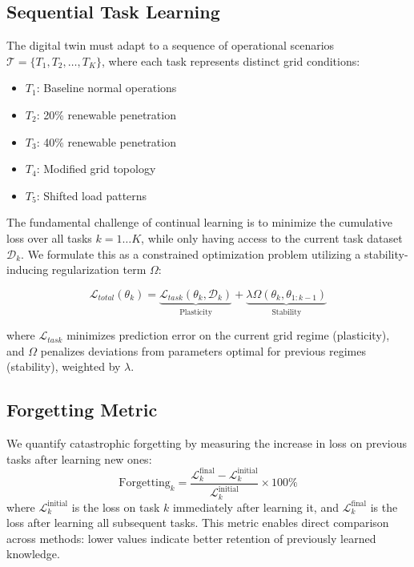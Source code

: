 \documentclass[journal,12pt,onecolumn]{IEEEtran}
\begin{document}
\subsection{Sequential Task Learning}

The digital twin must adapt to a sequence of operational scenarios $\mathcal{T} = \{T_1, T_2, \ldots, T_K\}$, where each task represents distinct grid conditions:
\begin{itemize}
    \item $T_1$: Baseline normal operations
    \item $T_2$: 20\% renewable penetration
    \item $T_3$: 40\% renewable penetration
    \item $T_4$: Modified grid topology
    \item $T_5$: Shifted load patterns
\end{itemize}

The fundamental challenge of continual learning is to minimize the cumulative loss over all tasks $k=1 \dots K$, while only having access to the current task dataset $\mathcal{D}_k$. We formulate this as a constrained optimization problem utilizing a stability-inducing regularization term $\Omega$:

\begin{equation}
\mathcal{L}_{total}(\theta_k) = \underbrace{\mathcal{L}_{task}(\theta_k, \mathcal{D}_k)}_{\text{Plasticity}} + \underbrace{\lambda \Omega(\theta_k, \theta_{1:k-1})}_{\text{Stability}}
\label{eq:cl_objective}
\end{equation}

where $\mathcal{L}_{task}$ minimizes prediction error on the current grid regime (plasticity), and $\Omega$ penalizes deviations from parameters optimal for previous regimes (stability), weighted by $\lambda$.

\subsection{Forgetting Metric}

We quantify catastrophic forgetting by measuring the increase in loss on previous tasks after learning new ones:
\begin{equation}
\text{Forgetting}_k = \frac{\mathcal{L}_k^{\text{final}} - \mathcal{L}_k^{\text{initial}}}{\mathcal{L}_k^{\text{initial}}} \times 100\%
\label{eq:forgetting}
\end{equation}
where $\mathcal{L}_k^{\text{initial}}$ is the loss on task $k$ immediately after learning it, and $\mathcal{L}_k^{\text{final}}$ is the loss after learning all subsequent tasks. This metric enables direct comparison across methods: lower values indicate better retention of previously learned knowledge.
\end{document}
